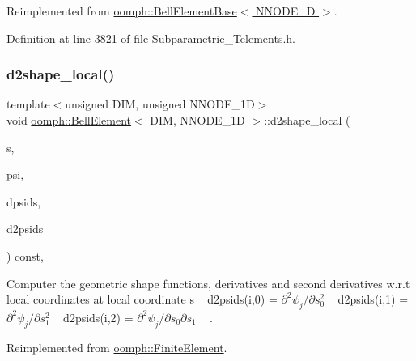 Reimplemented from \hyperlink{classoomph_1_1BellElementBase_ac6c1add4a996cf149da6c85ee3f4b637}{oomph\+::\+Bell\+Element\+Base$<$ N\+N\+O\+D\+E\+\_\+D $>$}.



Definition at line 3821 of file Subparametric\+\_\+\+Telements.\+h.

\mbox{\label{classoomph_1_1BellElement_a60c49217f94a452387d83a521c681d01}} 
\subsubsection{\texorpdfstring{d2shape\+\_\+local()}{d2shape\_local()}}
{\footnotesize\ttfamily template$<$unsigned D\+IM, unsigned N\+N\+O\+D\+E\+\_\+1D$>$ \\
void \hyperlink{classoomph_1_1BellElement}{oomph\+::\+Bell\+Element}$<$ D\+IM, N\+N\+O\+D\+E\+\_\+1D $>$\+::d2shape\+\_\+local (\begin{DoxyParamCaption}\item[{const \hyperlink{classoomph_1_1Vector}{Vector}$<$ double $>$ \&}]{s,  }\item[{\hyperlink{classoomph_1_1Shape}{Shape} \&}]{psi,  }\item[{\hyperlink{classoomph_1_1DShape}{D\+Shape} \&}]{dpsids,  }\item[{\hyperlink{classoomph_1_1DShape}{D\+Shape} \&}]{d2psids }\end{DoxyParamCaption}) const\hspace{0.3cm}{\ttfamily [inline]}, {\ttfamily [virtual]}}



Computer the geometric shape functions, derivatives and second derivatives w.\+r.\+t local coordinates at local coordinate s ~\newline
d2psids(i,0) = $ \partial^2 \psi_j / \partial s_0^2 $ ~\newline
d2psids(i,1) = $ \partial^2 \psi_j / \partial s_1^2 $ ~\newline
d2psids(i,2) = $ \partial^2 \psi_j / \partial s_0 \partial s_1 $ ~\newline
. 



Reimplemented from \hyperlink{classoomph_1_1FiniteElement_a53e5051582d9da07b9d35da9debd0cd7}{oomph\+::\+Finite\+Element}.



